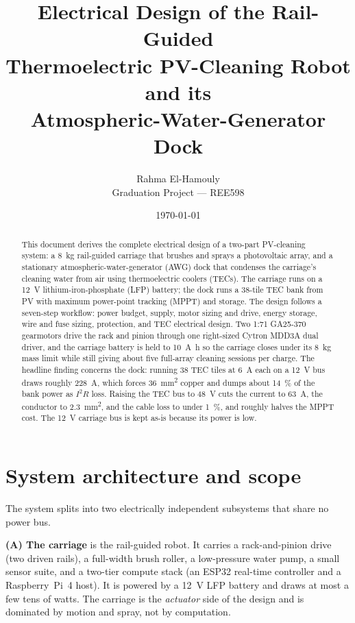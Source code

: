 \documentclass[11pt,a4paper]{article}
\title{\bfseries Electrical Design of the Rail-Guided\\
Thermoelectric PV-Cleaning Robot and its\\
Atmospheric-Water-Generator Dock}
\author{Rahma El-Hamouly \\ Graduation Project --- REE598}
\date{\today}
\begin{document}
\maketitle

\begin{abstract}
\noindent
This document derives the complete electrical design of a two-part PV-cleaning
system: a \SI{8}{\kilo\gram} rail-guided carriage that brushes and sprays a
photovoltaic array, and a stationary atmospheric-water-generator (AWG) dock that
condenses the carriage's cleaning water from air using thermoelectric coolers
(TECs). The carriage runs on a \SI{12}{\volt} lithium-iron-phosphate (LFP)
battery; the dock runs a \num{38}-tile TEC bank from PV with maximum power-point
tracking (MPPT) and storage. The design follows a seven-step workflow: power
budget, supply, motor sizing and drive, energy storage, wire and fuse sizing,
protection, and TEC electrical design. Two \num{1}:\num{71} GA25-370 gearmotors
drive the rack and pinion through one right-sized Cytron MDD3A dual driver, and
the carriage battery is held to \SI{10}{\ampere\hour} so the carriage closes
under its \SI{8}{\kilo\gram} mass limit while still giving about five full-array
cleaning sessions per charge. The headline finding concerns the dock: running
\num{38} TEC tiles at
\SI{6}{\ampere} each on a \SI{12}{\volt} bus draws roughly \SI{228}{\ampere},
which forces \SI{36}{\milli\meter\squared} copper and dumps about \SI{14}{\percent}
of the bank power as $I^2R$ loss. Raising the TEC bus to \SI{48}{\volt} cuts the
current to \SI{63}{\ampere}, the conductor to \SI{2.3}{\milli\meter\squared}, and
the cable loss to under \SI{1}{\percent}, and roughly halves the MPPT cost. The
\SI{12}{\volt} carriage bus is kept as-is because its power is low.
\end{abstract}

\tableofcontents
\bigskip

\section{System architecture and scope}
\label{sec:arch}

The system splits into two electrically independent subsystems that share no
power bus.

\textbf{(A) The carriage} is the rail-guided robot. It carries a rack-and-pinion
drive (two driven rails), a full-width brush roller, a low-pressure water pump, a
small sensor suite, and a two-tier compute stack (an ESP32 real-time controller
and a Raspberry~Pi~4 host). It is powered by a \SI{12}{\volt} LFP battery and
draws at most a few tens of watts. The carriage is the \emph{actuator} side of
the design and is dominated by motion and spray, not by computation.
\end{document}
